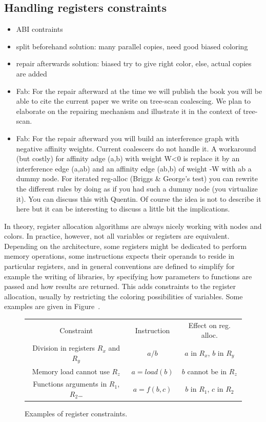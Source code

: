 {\subsection{Handling registers constraints}
{\sl
\begin{itemize}
  \item ABI contraints
  \item split beforehand solution: many parallel copies, need good biased 
    coloring
  \item repair afterwards solution: biased try to give right color, else, 
    actual copies are added
  \item Fab: For the repair afterward at the time we will publish the book you 
    will be able to cite the current paper we write on tree-scan coalescing. We 
    plan to elaborate on the repairing mechanism and illustrate it in the 
    context of tree-scan.
  \item Fab: For the repair afterward you will build an interference graph with 
    negative affinity weights. Current coalescers do not handle it. A 
    workaround (but costly) for affinity adge (a,b) with weight W<0 is replace 
    it by an interference edge (a,ab) and an affinity edge (ab,b) of weight -W 
    with ab a dummy node. For iterated reg-alloc (Briggs \& George's test) you 
    can rewrite the different rules by doing as if you had such a dummy node 
    (you virtualize it). You can discuss this with Quentin. Of course the idea 
    is not to describe it here but it can be interesting to discuss a little 
    bit the implications.
\end{itemize}
}

In theory, register allocation algorithms are always nicely working with nodes 
and colors. In practice, however, not all variables or registers are 
equivalent. Depending on the architecture, some registers might be dedicated 
to perform memory operations, some instructions expects their operands to 
reside in particular registers, and in general conventions are defined to 
simplify for example the writing of libraries, by specifying how parameters to 
functions are passed and how results are returned. This adds constraints to the 
register allocation, usually by restricting the coloring possibilities of 
variables. Some examples are given in Figure~\label{fig:reg-constraints}.

\begin{figure}
  \begin{tabular}{ccc}
    Constraint  & Instruction & Effect on reg. alloc. \\
    Division in registers $R_x$ and $R_y$ & $a / b$ & $a$ in $R_x$, $b$ in $R_y$\\
    Memory load cannot use $R_z$ & $a = load(b)$ & $b$ cannot be in $R_z$\\
    Functions arguments in $R_1$, $R_2$\ldots & $a = f(b,c)$ & $b$ in $R_1$, 
    $c$ in $R_2$ \\
  \end{tabular}
  \caption{Examples of register constraints.}
  \label{fig:reg-constraints}
\end{figure}


}
